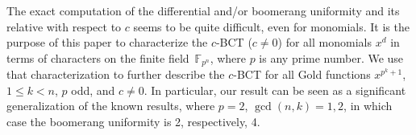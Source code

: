 \documentclass[11pt]{article}
\def\F{{\mathbb F}}
\begin{document}
  The exact computation of the differential and/or boomerang uniformity and its relative with respect to $c$ seems to be quite difficult, even for monomials.
  It is the purpose of this paper to characterize the $c$-BCT ($c\neq 0$) for all monomials $x^d$ in terms of characters on the finite field~$\F_{p^n}$, where $p$ is any prime number. We use that characterization to further describe the $c$-BCT for all Gold functions $x^{p^k+1}$, $1\leq k<n$, $p$ odd, and $c\neq 0$.  In particular, our result can be seen as a significant generalization of the known results, where $p=2$, $\gcd(n,k)=1,2$, in which case the boomerang uniformity is 2, respectively, 4.
\end{document}
